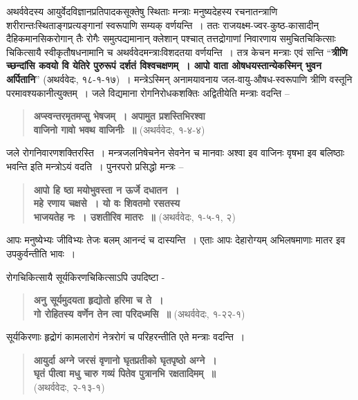 {अथर्ववेदस्य आयुर्वेदविज्ञानप्रतिपादकसूक्तेषु स्थिताः मन्त्राः मनुष्यदेहस्य रचनातन्त्राणि \-शरीरान्तःस्थिताङ्गप्रत्यङ्गानां स्वरूपाणि सम्यक् वर्णयन्ति~। ततः राजयक्ष्म-ज्वर-कुष्ठ-\break कासादीन् दैहिकमानसिकरोगान् तैः रोगैः समुत्पद्यमानान् क्लेशान् पश्चात् तत्तद्रोगाणां \break निवारणाय समुचितचिकित्साः चिकित्सायै स्वीकृतौषधनामानि च अथर्ववेदमन्त्राः\break विशदतया वर्णयन्ति~। तत्र केचन मन्त्राः एवं सन्ति “\textbf{त्रीणि च्छन्दांसि कवयो वि येतिरे \-पुरुरूपं दर्शतं विश्वचक्षणम्~। आपो वाता ओषधयस्तान्येकस्मिन् भुवन अर्पितानि}” \-(अथर्ववेदः, १८-१-१७)~। मन्त्रेऽस्मिन् अनामयावनाय जल-वायु-औषध-स्वरूपाणि \-त्रीणि वस्तूनि परमावश्यकानीत्युक्तम्~। जले विद्यमाना रोगनिरोधकशक्तिः अद्वितीयेति मन्त्राः वदन्ति –
\begin{verse}
\textbf{अप्स्वन्तरमृतमप्सु भेषजम्~। अपामुत प्रशस्तिभिरश्वा}\\
\textbf{वाजिनो गावो भवथ वाजिनीः~॥} (अथर्ववेदः, १-४-४)
\end{verse}
जले रोगनिवारणशक्तिरस्ति~। मन्त्रजलनिषेचनेन सेवनेन च मानवाः अश्वा इव वाजिनः वृषभा इव बलिष्ठाः भवन्ति इति मन्त्रोऽयं वदति~। पुनरपरो प्रसिद्धो मन्त्रः –

\begin{verse}
\textbf{आपो हि ष्ठा मयोभुवस्ता न ऊर्जे दधातन~। }\\
\textbf{महे रणाय चक्षसे~। यो वः शिवतमो रसतस्य}\\
\textbf{भाजयतेह नः~। उशतीरिव मातरः~॥} (अथर्ववेदः, १-५-१, २)
\end{verse}

आपः मनुष्येभ्यः जीविभ्यः तेजः बलम् आनन्दं च दास्यन्ति~। एताः आपः देहारोग्यम् अभिलषमाणाः मातर इव उपकुर्वन्तीति भावः~। 

रोगचिकित्सायै सूर्यकिरणचिकित्साऽपि उपदिष्टा -

\begin{verse}
\textbf{अनु सूर्यमुदयता हृद्योतो हरिमा च ते~। }\\
\textbf{गो रोहितस्य वर्णेन तेन त्वा परिदध्मसि~॥} (अथर्ववेदः, १-२२-१)
\end{verse}

सूर्यकिरणाः हृद्रोगं कामलारोगं नेत्ररोगं च परिहरन्तीति एते मन्त्राः वदन्ति~। 

\begin{verse}
\textbf{आयुर्दा अग्ने जरसं वृणानो घृतप्रतीको घृतपृष्ठो अग्ने~। }\\
\textbf{घृतं पीत्वा मधु चारु गव्यं पितेव पुत्रानभि रक्षतादिमम्~॥}\\
\hspace{6cm}(अथर्ववेदः, २-१३-१)
\end{verse}

}
